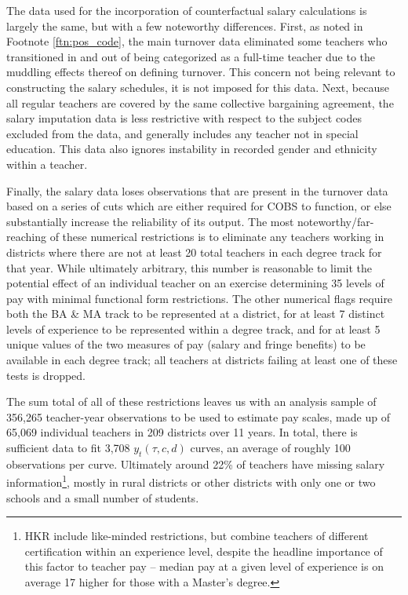 \documentclass[12pt,]{article}
\let\rmarkdownfootnote\footnote%
\def\footnote{\protect\rmarkdownfootnote}
\begin{document}
The data used for the incorporation of counterfactual salary
calculations is largely the same, but with a few noteworthy differences.
First, as noted in Footnote \ref{ftn:pos_code}, the main turnover data
eliminated some teachers who transitioned in and out of being
categorized as a full-time teacher due to the muddling effects thereof
on defining turnover. This concern not being relevant to constructing
the salary schedules, it is not imposed for this data. Next, because all
regular teachers are covered by the same collective bargaining
agreement, the salary imputation data is less restrictive with respect
to the subject codes excluded from the data, and generally includes any
teacher not in special education. This data also ignores instability in
recorded gender and ethnicity within a teacher.

Finally, the salary data loses observations that are present in the
turnover data based on a series of cuts which are either required for
COBS to function, or else substantially increase the reliability of its
output. The most noteworthy/far-reaching of these numerical restrictions
is to eliminate any teachers working in districts where there are not at
least 20 total teachers in each degree track for that year. While
ultimately arbitrary, this number is reasonable to limit the potential
effect of an individual teacher on an exercise determining 35 levels of
pay with minimal functional form restrictions. The other numerical flags
require both the BA \& MA track to be represented at a district, for at
least 7 distinct levels of experience to be represented within a degree
track, and for at least 5 unique values of the two measures of pay
(salary and fringe benefits) to be available in each degree track; all
teachers at districts failing at least one of these tests is dropped.

The sum total of all of these restrictions leaves us with an analysis
sample of 356,265 teacher-year observations to be used to estimate pay
scales, made up of 65,069 individual teachers in 209 districts over 11
years. In total, there is sufficient data to fit 3,708
\(y_t(\tau, c, d)\) curves, an average of roughly 100 observations per
curve. Ultimately around 22\% of teachers have missing salary
information\footnote{HKR include like-minded restrictions, but combine
  teachers of different certification within an experience level,
  despite the headline importance of this factor to teacher pay --
  median pay at a given level of experience is on average 17 higher for
  those with a Master's degree.}, mostly in rural districts or other
districts with only one or two schools and a small number of students.
\end{document}
